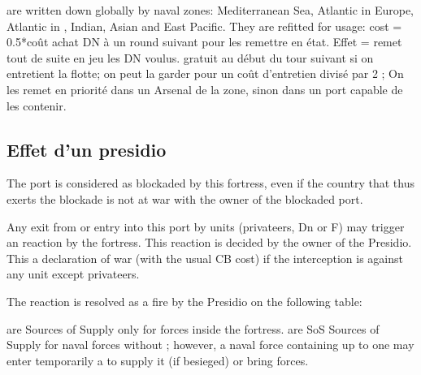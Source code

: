   \ND are written down globally by naval zones:
Mediterranean Sea, Atlantic in Europe, Atlantic in \ROTW, Indian, Asian and East Pacific.
They are refitted for usage:
\bparag cost = 0.5*coût achat DN à un round suivant pour les remettre en état.
               Effet = remet tout de suite en jeu les DN voulus.
\bparag gratuit au début du tour suivant si on entretient la flotte;
\bparag on peut la garder  pour un coût d'entretien divisé par 2 ;
\bparag On les remet en priorité dans un Arsenal de la zone, sinon dans un
port capable de les contenir.

\subsection{Effet d'un presidio}\label{chMilitary:Presidios}

\bparag The port is considered as blockaded by this fortress, even if the
country that thus exerts the blockade is not at war with the owner of
the blockaded port.

\bparag Any exit from or entry into this port by units (privateers, Dn
or F) may trigger an reaction by the fortress. This reaction is decided
by the owner of the Presidio. This a declaration of war (with the usual
CB cost) if the interception is against any unit except privateers.

\bparag The reaction is resolved as a fire by the Presidio on the following table:
\interceptionb

\bparag \Presidios are Sources of Supply only for forces inside the fortress.
\bparag \Presidios are SoS Sources of Supply for naval forces without \FLEET;
however, a naval force containing up to one \FLEET may enter temporarily a
\Presidio to supply it (if besieged) or bring forces.

